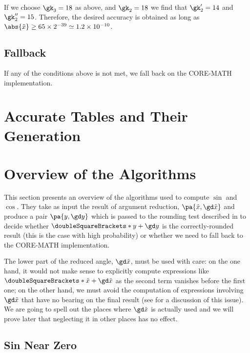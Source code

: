 \documentclass[10pt, a4paper, twoside]{basestyle}
\newcommand{\round}[1]{\doubleSquareBrackets*{#1}}
\newcommand{\red}[1]{\tilde{#1}}
\begin{document}
If we choose $\gk_3 = 18$ as above, and $\gk_2 = 18$ we find that $\gk'_2 = 14$ and $\gk''_2 = 15$.  Therefore, the desired accuracy is obtained as long as $\abs{\red x} \geq 65 \times 2^{-39} \simeq 1.2 \times 10^{-10}$.

\subsection*{Fallback}

If any of the conditions above is not met, we fall back on the CORE-MATH implementation.

\section*{Accurate Tables and Their Generation}


\section*{Overview of the Algorithms}

This section presents an overview of the algorithms used to compute $\sin$ and $\cos$.  They take as input the result of argument reduction, $\pa{\red x, \gd \red x}$ and produce a pair $\pa{y, \gd y}$ which is passed to the rounding test described in \cite[397]{MullerBrisebarreDeDinechinJeannerodLefevreMelquiondRevolStehleTorres2010} to decide whether $\round{y + \gd y}$ is the correctly-rounded result (this is the case with high probability) or whether we need to fall back to the CORE-MATH implementation.

The lower part of the reduced angle, $\gd \red x$, must be used with care: on the one hand, it would not make sense to explicitly compute expressions like $\round{\red x + \gd \red x}$ as the second term vanishes before the first one; on the other hand, we must avoid the computation of expressions involving $\gd \red x$ that have no bearing on the final result (see \cite[402-404]{MullerBrisebarreDeDinechinJeannerodLefevreMelquiondRevolStehleTorres2010} for a discussion of this issue).  We are going to spell out the places where $\gd \red x$ is actually used and we will prove later that neglecting it in other places has no effect.

\subsection*{Sin Near Zero}
\end{document}

